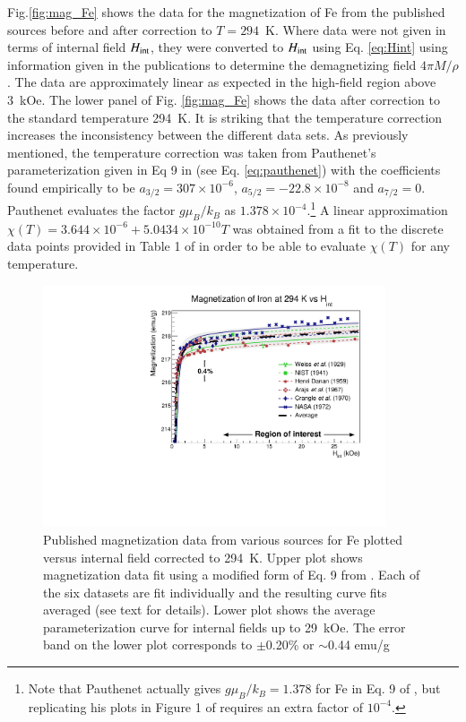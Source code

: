 \documentclass[preprint,12pt]{elsarticle}
\begin{document}
Fig.\ref{fig:mag_Fe} shows the data for the magnetization of Fe from the published sources before and after correction to $T=294$~K. Where data were not given in terms of internal field $H_{\rm int}$, they were converted to $H_{\rm int}$ using Eq. \ref{eq:Hint} using information given in the publications to determine the demagnetizing field $4\pi M/\rho$. The data are approximately linear as expected in the high-field region above 3~kOe. The lower panel of Fig. \ref{fig:mag_Fe}  shows the data after correction to the standard temperature 294~K. It is striking that the temperature correction increases the inconsistency between the different data sets. As previously mentioned, the temperature correction was taken from Pauthenet's parameterization given in Eq 9 in \cite{PauthenetMar1982} (see Eq. \ref{eq:pauthenet}) with the coefficients found empirically to be $a_{3/2}=307\times 10^{-6}$,  $a_{5/2}=-22.8\times10^{-8}$ and $a_{7/2}=0$. Pauthenet evaluates the factor $g\mu_B/k_B$ as $1.378\times10^{-4}$.\footnote{Note that Pauthenet actually gives $g\mu_B/k_B=1.378$ for Fe in Eq. 9  of \cite{PauthenetMar1982}, but  replicating his plots in Figure 1 of \cite{PauthenetMar1982} requires an extra factor of $10^{-4}$.} A linear approximation $\chi(T)=3.644\times10^{-6}+5.0434\times10^{-10}T$ was obtained from a fit to the discrete data points provided in Table 1 of \cite{PauthenetMar1982} in order to be able to evaluate $\chi(T)$ for any temperature. 

\begin{figure}
\centering
\includegraphics[width=0.9\textwidth]{FeComboPlotWithErrorBand.pdf}
\caption{Published magnetization data from various sources for Fe plotted versus internal field corrected to 294~K. Upper plot shows magnetization data fit using a modified form of Eq. 9 from \cite{PauthenetMar1982}. Each of the six datasets are fit individually and the resulting curve fits averaged (see text for details). Lower plot shows the average parameterization curve for internal fields up to 29~kOe.  The error band on the lower plot corresponds to $\pm$0.20\% or $\sim$0.44 {\rm emu/g} }
\label{fig:mag_errorband_Fe}
\end{figure}
\end{document}
